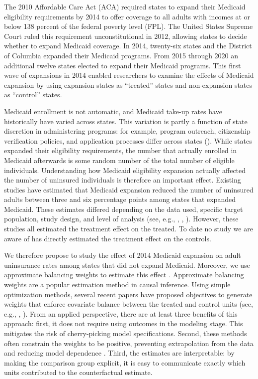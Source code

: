 The 2010 Affordable Care Act (ACA) required states to expand their Medicaid eligibility requirements by 2014 to offer coverage to all adults with incomes at or below 138 percent of the federal poverty level (FPL). The United States Supreme Court ruled this requirement unconstitutional in 2012, allowing states to decide whether to expand Medicaid coverage. In 2014, twenty-six states and the District of Columbia expanded their Medicaid programs. From 2015 through 2020 an additional twelve states elected to expand their Medicaid programs. This first wave of expansions in 2014 enabled researchers to examine the effects of Medicaid expansion by using expansion states as ``treated'' states and non-expansion states as ``control'' states. 

Medicaid enrollment is not automatic, and Medicaid take-up rates have historically have varied across states. This variation is partly a function of state discretion in administering programs: for example, program outreach, citizenship verification policies, and application processes differ across states (\cite{courtemanche2017early}). While states expanded their eligibility requirements, the number that actually enrolled in Medicaid afterwards is some random number of the total number of eligible individuals. Understanding how Medicaid eligibility expansion actually affected the number of uninsured individuals is therefore an important effect. Existing studies have estimated that Medicaid expansion reduced the number of uninsured adults between three and six percentage points among states that expanded Medicaid. These estimates differed depending on the data used, specific target population, study design, and level of analysis (see, e.g., \cite{kaestner2017effects}, \cite{courtemanche2017early}, \cite{frean2017premium}). However, these studies all estimated the treatment effect on the treated. To date no study we are aware of has directly estimated the treatment effect on the controls. 

We therefore propose to study the effect of 2014 Medicaid expansion on adult uninsurance rates among states that did not expand Medicaid. Moreover, we use approximate balancing weights to estimate this effect \cite{wang2017minimal}. Approximate balancing weights are a popular estimation method in causal inference. Using simple optimization methods, several recent papers have proposed objectives to generate weights that enforce covariate balance between the treated and control units (see, e.g., \cite{abadie2010synthetic}, \cite{zubizarreta2015stable}). From an applied perspective, there are at least three benefits of this approach: first, it does not require using outcomes in the modeling stage. This mitigates the risk of cherry-picking model specifications. Second, these methods often constrain the weights to be positive, preventing extrapolation from the data and reducing model dependence \cite{zubizarreta2015stable}. Third, the estimates are interpretable: by making the comparison group explicit, it is easy to communicate exactly which units contributed to the counterfactual estimate.

